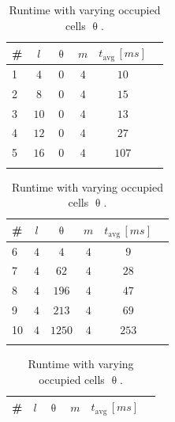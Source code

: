 \documentclass{svproc}
\begin{document}
\begin{table}[!htb]%
\begin{minipage}{.3\textwidth}
    \centering
    \begin{tabular}{|l|c|c|c|c|r|}
        \hline
         \#&$l$&$\uptheta$ &$m$&$t_{\text{avg}}\,[\si{ms}]$  \\ \hline
         1 & $4$ & $0$ & $4$ & $10$\\ \hline
         2 & $8$ & $0$ & $4$ & $15$\\ \hline
         3 & $10$ & $0$ & $4$ & $13$ \\ \hline
         4 & $12$ & $0$ & $4$ & $27$ \\ \hline
         5 & $16$ & $0$ & $4$ & $107$ \\ \hline
         \multicolumn{5}{c}{}\\
    \end{tabular}
    \caption{Runtime with varying curve count $l$.}
    \label{tab:curveCountScalability}
\end{minipage}
\hfill
\begin{minipage}{.3\textwidth}
    \centering
    \begin{tabular}{|l|c|c|c|c|r|}
        \hline
         \#&$l$&$\uptheta$ &$m$&$t_{\text{avg}}\,[\si{ms}]$  \\ \hline
         6 & $4$ & $4$ & $4$ & $9$ \\ \hline
         7 & $4$ & $62$ & $4$ & $28$ \\ \hline
         8 & $4$ & $196$ & $4$ & $47$  \\ \hline
         9 & $4$ & $213$ & $4$ & $69$  \\ \hline
         10 & $4$ & $1250$ & $4$ & $253$  \\ \hline
         \multicolumn{5}{c}{}\\
    \end{tabular}
    \caption{Runtime with varying occupied cells $\uptheta$.}
    \label{tab:obstacleCountScalability}
\end{minipage}
\hfill
\begin{minipage}{.3\textwidth}
    \centering
    \begin{tabular}{|l|c|c|c|c|r|}
        \hline
         \#&$l$&$\uptheta$ &$m$&$t_{\text{avg}}\,[\si{ms}]$  \\ \hline

\end{tabular}
\end{minipage}
\end{table}
\end{document}
